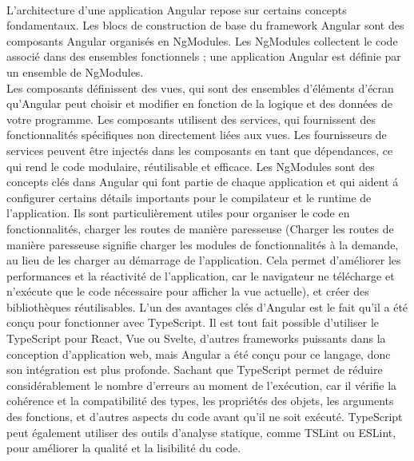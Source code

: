 			\paragraph{} L'architecture d'une application Angular repose sur certains concepts fondamentaux. Les blocs de construction de base du framework Angular sont des composants Angular organis\'es en NgModules. Les NgModules collectent le code associ\'e dans des ensembles fonctionnels ; une application Angular est d\'efinie par un ensemble de NgModules.\\
			Les composants d\'efinissent des vues, qui sont des ensembles d'\'el\'ements d'\'ecran qu'Angular peut choisir et modifier en fonction de la logique et des donn\'ees de votre programme.
			Les composants utilisent des services, qui fournissent des fonctionnalit\'es sp\'ecifiques non directement li\'ees aux vues. Les fournisseurs de services peuvent \^etre inject\'es dans les composants en tant que d\'ependances, ce qui rend le code modulaire, r\'eutilisable et efficace.
			Les NgModules sont des concepts cl\'es dans Angular qui font partie de chaque application et qui aident \'a configurer certains d\'etails importants pour le compilateur et le runtime de l'application. Ils sont particuli\`erement utiles pour organiser le code en fonctionnalit\'es, charger les routes de mani\`ere paresseuse (Charger les routes de mani\`ere paresseuse signifie charger les modules de fonctionnalit\'es \`a la demande, au lieu de les charger au d\'emarrage de l'application. Cela permet d'am\'eliorer les performances et la r\'eactivit\'e de l'application, car le navigateur ne t\'el\'echarge et n'ex\'ecute que le code n\'ecessaire pour afficher la vue actuelle), et cr\'eer des biblioth\`eques r\'eutilisables.
			L'un des avantages cl\'es d'Angular est le fait qu'il a \'et\'e conçu pour fonctionner avec TypeScript. Il est tout fait possible d'utiliser le TypeScript pour React, Vue ou Svelte, d'autres frameworks puissants dans la conception d'application web, mais Angular a \'et\'e conçu pour ce langage, donc son int\'egration est plus profonde.
			Sachant que TypeScript permet de r\'eduire consid\'erablement le nombre d'erreurs au moment de l'ex\'ecution, car il v\'erifie la coh\'erence et la compatibilit\'e des types, les propri\'et\'es des objets, les arguments des fonctions, et d'autres aspects du code avant qu'il ne soit ex\'ecut\'e. TypeScript peut \'egalement utiliser des outils d'analyse statique, comme TSLint ou ESLint,  pour am\'eliorer la qualit\'e et la lisibilit\'e du code.
			

